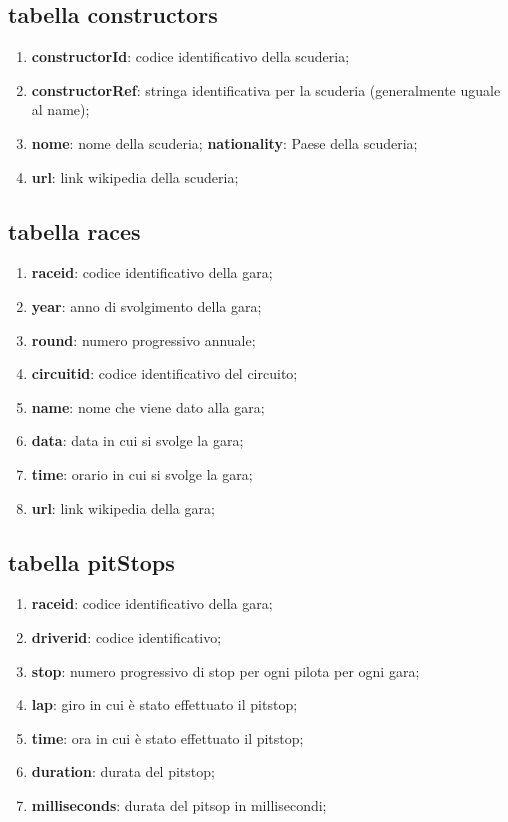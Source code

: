 \subsection{tabella constructors}%
\begin{enumerate}
    \item \textbf{constructorId}: codice identificativo della scuderia;
    \item \textbf{constructorRef}: stringa identificativa per la scuderia (generalmente uguale al name);
    \item \textbf{nome}: nome della scuderia;
 \textbf{nationality}: Paese della scuderia;
    \item \textbf{url}: link wikipedia della scuderia;
\end{enumerate}
\subsection{tabella races}%
\begin{enumerate}
    \item \textbf{raceid}: codice identificativo della gara;
    \item \textbf{year}: anno di svolgimento della gara;
    \item \textbf{round}: numero progressivo annuale;
    \item \textbf{circuitid}: codice identificativo del circuito;
    \item \textbf{name}: nome che viene dato alla gara;
    \item \textbf{data}: data in cui si svolge la gara;
    \item \textbf{time}: orario in cui si svolge la gara;
    \item \textbf{url}: link wikipedia della gara;
\end{enumerate}
\subsection{tabella pitStops}%
\begin{enumerate}
    \item \textbf{raceid}: codice identificativo della gara;
    \item \textbf{driverid}: codice identificativo;
    \item \textbf{stop}: numero progressivo di stop per ogni pilota per ogni gara;
    \item \textbf{lap}: giro in cui è stato effettuato il pitstop;
    \item \textbf{time}: ora in cui è stato effettuato il pitstop;
    \item \textbf{duration}: durata del pitstop;
    \item \textbf{milliseconds}: durata del pitsop in millisecondi;
\end{enumerate}
